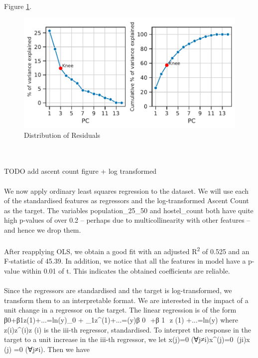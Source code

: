 \documentclass[11pt,a4paper]{article}
\begin{document}
Figure \ref{fds-project-template:fig:scree_plot}.
\begin{figure} [h!]
  \centering
  \includegraphics{report/scree_plot.pdf}
  \caption{Distribution of Residuals}
  \label{fds-project-template:fig:scree_plot}
\end{figure} \\ \\ 
TODO add ascent count figure + log transformed \\  \\
We now apply ordinary least squares regression to the dataset. We will use each of the standardised features as regressors and the log-transformed Ascent Count as the target. The variables population\_25\_50 and hostel\_count both have quite high p-values of over 0.2 – perhaps due to multicollinearity with other features – and hence we drop them. \\  \\
After reapplying OLS, we obtain a good fit with an adjusted R\textsuperscript{2} of 0.525 and an F-statistic of 45.39. In addition, we notice that all the features in model have a p-value within 0.01 of t. This indicates the obtained coefficients are reliable. \\  \\
Since the regressors are standardised and the target is log-transformed, we transform them to an interpretable format. We are interested in the impact of a unit change in a regressor on the target. The linear regression is of the form β0+β1z(1)+...=ln⁡(y)\beta_0 + \beta_1z^{(1)}+...=\ln(y)β 
0
​	 +β 
1
​	 z 
(1)
 +...=ln(y) where z(i)z^{(i)}z 
(i)
  is the iii-th regressor, standardised. To interpret the response in the target to a unit increase in the iii-th regressor, we let x(j)=0 (∀j≠i)x^{(j)}=0\ (\forall j\neq i)x 
(j)
 =0 (∀j≠i). Then we have
\end{document}
